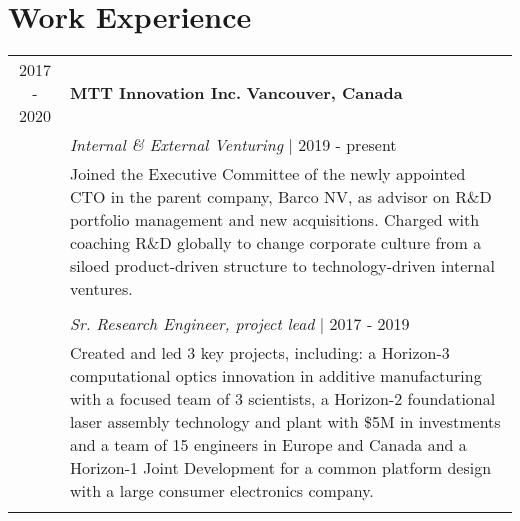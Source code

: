 \documentclass[a4paper,10pt]{article}
\begin{document}
\pagestyle{plain}
\USheader

\section{Work Experience}
\begin{tabularx}{\textwidth}{cX}
2017 - 2020 & \textbf{MTT Innovation Inc.} \hfill \textbf{Vancouver, Canada} \\
& \textit{Internal \& External Venturing} | 2019 - present \\
& Joined the Executive Committee of the newly appointed CTO in the parent company, Barco NV,
as advisor on R\&D portfolio management and new acquisitions. %
Charged with coaching R\&D globally to change corporate culture from a siloed product-driven %
structure to technology-driven internal ventures. \\
& \\
& \textit{Sr. Research Engineer, project lead} | 2017 - 2019 \\
& Created and led 3 key projects, including: a Horizon-3 computational optics innovation in additive manufacturing
with a focused team of 3 scientists, a Horizon-2 foundational laser assembly technology and plant with \$5M 
in investments and a team of 15 engineers in Europe and Canada and a Horizon-1 Joint Development for a 
common platform design with a large consumer electronics company.
\\
& \\

\end{tabularx}
\end{document}
